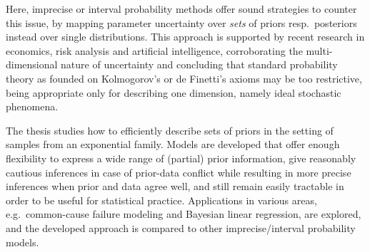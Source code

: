 Here, imprecise or interval probability methods offer sound strategies to counter this issue,
by mapping parameter uncertainty over \emph{sets} of priors resp.\ posteriors instead over single distributions.
This approach is supported by recent research in economics, risk analysis and artificial intelligence,
corroborating the multi-dimensional nature of uncertainty and concluding that standard probability theory
as founded on Kolmogorov's or de Finetti's axioms may be too restrictive,
being appropriate only for describing one dimension, namely ideal stochastic phenomena.

The thesis studies how to efficiently describe sets of priors in the setting of samples from an exponential family. 
Models are developed that offer enough flexibility to express a wide range of (partial) prior information,
give reasonably cautious inferences in case of prior-data conflict while resulting in more precise inferences when prior and data agree well,
and still remain easily tractable in order to be useful for statistical practice.
Applications in various areas, e.g.\ common-cause failure modeling and Bayesian linear regression, are explored,
and the developed approach is compared to other imprecise/interval probability models.
